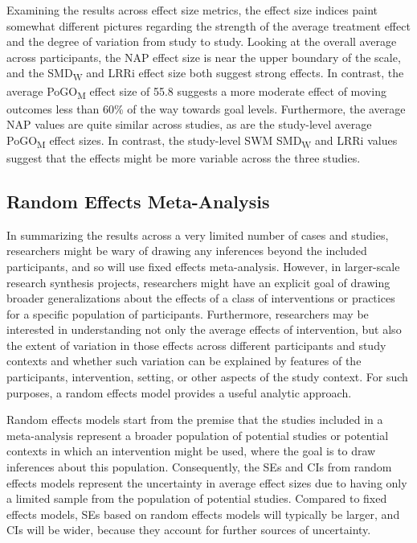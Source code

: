\documentclass[
]{book}
\begin{document}
Examining the results across effect size metrics, the effect size indices paint somewhat different pictures regarding the strength of the average treatment effect and the degree of variation from study to study. Looking at the overall average across participants, the NAP effect size is near the upper boundary of the scale, and the SMD\textsubscript{W} and LRRi effect size both suggest strong effects. In contrast, the average PoGO\textsubscript{M} effect size of 55.8 suggests a more moderate effect of moving outcomes less than 60\% of the way towards goal levels. Furthermore, the average NAP values are quite similar across studies, as are the study-level average PoGO\textsubscript{M} effect sizes. In contrast, the study-level SWM SMD\textsubscript{W} and LRRi values suggest that the effects might be more variable across the three studies.

\hypertarget{random-effects-meta-analysis}{%
\subsection{Random Effects Meta-Analysis}\label{random-effects-meta-analysis}}

In summarizing the results across a very limited number of cases and studies, researchers might be wary of drawing any inferences beyond the included participants, and so will use fixed effects meta-analysis. However, in larger-scale research synthesis projects, researchers might have an explicit goal of drawing broader generalizations about the effects of a class of interventions or practices for a specific population of participants. Furthermore, researchers may be interested in understanding not only the average effects of intervention, but also the extent of variation in those effects across different participants and study contexts and whether such variation can be explained by features of the participants, intervention, setting, or other aspects of the study context. For such purposes, a random effects model provides a useful analytic approach.

Random effects models start from the premise that the studies included in a meta-analysis represent a broader population of potential studies or potential contexts in which an intervention might be used, where the goal is to draw inferences about this population. Consequently, the SEs and CIs from random effects models represent the uncertainty in average effect sizes due to having only a limited sample from the population of potential studies. Compared to fixed effects models, SEs based on random effects models will typically be larger, and CIs will be wider, because they account for further sources of uncertainty.
\end{document}
